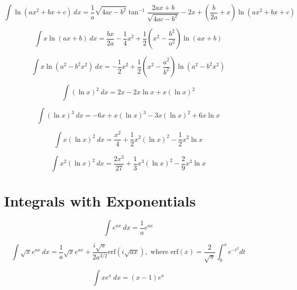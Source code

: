 \begin{equation}
\int \ln \left ( ax^2 + bx + c\right) \ dx  = \frac{1}{a}\sqrt{4ac-b^2}\tan^{-1}\frac{2ax+b}{\sqrt{4ac-b^2}}
-2x + \left( \frac{b}{2a}+x \right )\ln \left (ax^2+bx+c \right) 
\end{equation}

\begin{equation}
\int x \ln (ax + b)\ dx = \frac{bx}{2a}-\frac{1}{4}x^2 
+\frac{1}{2}\left(x^2-\frac{b^2}{a^2}\right)\ln (ax+b) 
\end{equation}

\begin{equation}
\int x \ln \left ( a^2 - b^2 x^2 \right )\ dx = -\frac{1}{2}x^2+ 
\frac{1}{2}\left( x^2 - \frac{a^2}{b^2} \right ) \ln \left (a^2 -b^2 x^2 \right) 
\end{equation}

\begin{equation}
\int (\ln x)^2\ dx = 2x - 2x \ln x + x (\ln x)^2
\end{equation}


\begin{equation}
\int (\ln x)^3\ dx = -6 x+x (\ln x)^3-3 x (\ln x)^2+6 x \ln x
\end{equation}
 
 
\begin{equation}
\int x (\ln x)^2\ dx = \frac{x^2}{4}+\frac{1}{2} x^2 (\ln x)^2-\frac{1}{2} x^2 \ln x
\end{equation}

\begin{equation}
\int x^2 (\ln x)^2\ dx = \frac{2 x^3}{27}+\frac{1}{3} x^3 (\ln x)^2-\frac{2}{9} x^3 \ln x
\end{equation}
 
 
 \section*{Integrals with Exponentials}

\begin{equation}
\int e^{ax}\ dx = \frac{1}{a}e^{ax} 
\end{equation}

\begin{equation}\label{eq:ajoy}
\int \sqrt{x} e^{ax}\ dx = \frac{1}{a}\sqrt{x}e^{ax} 
+\frac{i\sqrt{\pi}}{2a^{3/2}}
\text{erf}\left(i\sqrt{ax}\right),
\text{ where erf}(x)=\frac{2}{\sqrt{\pi}}\int_0^x e^{-t^2}dt
\end{equation}

\begin{equation}
\int x e^x\ dx = (x-1) e^x 
\end{equation}

